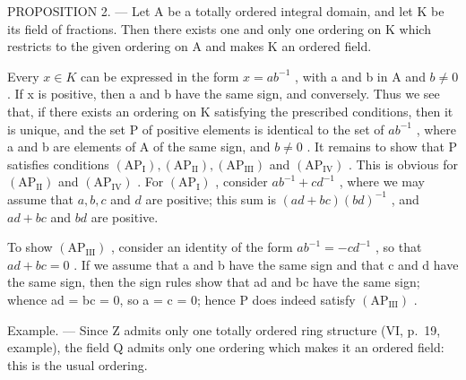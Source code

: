 PROPOSITION 2. --- Let A be a totally ordered integral domain, and let K be its field of fractions. Then there exists one and only one ordering on K which restricts to the given ordering on A and makes K an ordered field.

Every \(x \in K\) can be expressed in the form \(x = ab^{-1}\) , with a and b in A and \(b \neq 0\) . If x is positive, then a and b have the same sign, and conversely. Thus we see that, if there exists an ordering on K satisfying the prescribed conditions, then it is unique, and the set P of positive elements is identical to the set of \(ab^{-1}\) , where a and b are elements of A of the same sign, and \(b \neq 0\) . It remains to show that P satisfies conditions \((\mathrm{AP}_{\mathrm{I}}), (\mathrm{AP}_{\mathrm{II}}), (\mathrm{AP}_{\mathrm{III}})\) and \((\mathrm{AP}_{\mathrm{IV}})\) . This is obvious for \((\mathrm{AP}_{\mathrm{II}})\) and \((\mathrm{AP}_{\mathrm{IV}})\) . For \((\mathrm{AP}_{\mathrm{I}})\) , consider \(ab^{-1} + cd^{-1}\) , where we may assume that \(a, b, c\) and \(d\) are positive; this sum is \((ad + bc)(bd)^{-1}\) , and \(ad + bc\) and \(bd\) are positive.

To show \((\mathrm{AP}_{\mathrm{III}})\) , consider an identity of the form \(ab^{-1} = -cd^{-1}\) , so that \(ad + bc = 0\) . If we assume that a and b have the same sign and that c and d have the same sign, then the sign rules show that ad and bc have the same sign; whence ad = bc = 0, so a = c = 0; hence P does indeed satisfy \((\mathrm{AP}_{\mathrm{III}})\) .

Example. --- Since Z admits only one totally ordered ring structure (VI, p.~19, example), the field Q admits only one ordering which makes it an ordered field: this is the usual ordering.

